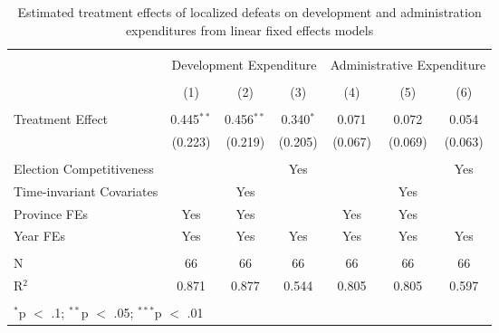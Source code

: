 
\begin{table}[!htbp] \centering 
  \caption{Estimated treatment effects of localized defeats on development and administration expenditures from linear fixed effects models} 
  \label{tab:lfe_mech} 
\begin{tabular}{@{\extracolsep{5pt}}lcccccc} 
\\[-1.8ex]\hline 
\hline \\[-1.8ex] 
 & \multicolumn{3}{c}{Development Expenditure} & \multicolumn{3}{c}{Administrative Expenditure} \\ 
\\[-1.8ex] & (1) & (2) & (3) & (4) & (5) & (6)\\ 
\hline \\[-1.8ex] 
 Treatment Effect & 0.445$^{**}$ & 0.456$^{**}$ & 0.340$^{*}$ & 0.071 & 0.072 & 0.054 \\ 
  & (0.223) & (0.219) & (0.205) & (0.067) & (0.069) & (0.063) \\ 
 \hline \\[-1.8ex] 
Election Competitiveness &  &  & Yes &  &  & Yes \\ 
Time-invariant Covariates &  & Yes &  &  & Yes &  \\ 
Province FEs & Yes & Yes &  & Yes & Yes &  \\ 
Year FEs & Yes & Yes & Yes & Yes & Yes & Yes \\ 
\hline \\[-1.8ex] 
N & 66 & 66 & 66 & 66 & 66 & 66 \\ 
R$^{2}$ & 0.871 & 0.877 & 0.544 & 0.805 & 0.805 & 0.597 \\ 
\hline 
\hline \\[-1.8ex] 
\multicolumn{7}{l}{$^{*}$p $<$ .1; $^{**}$p $<$ .05; $^{***}$p $<$ .01} \\ 
\end{tabular} 
\end{table} 
